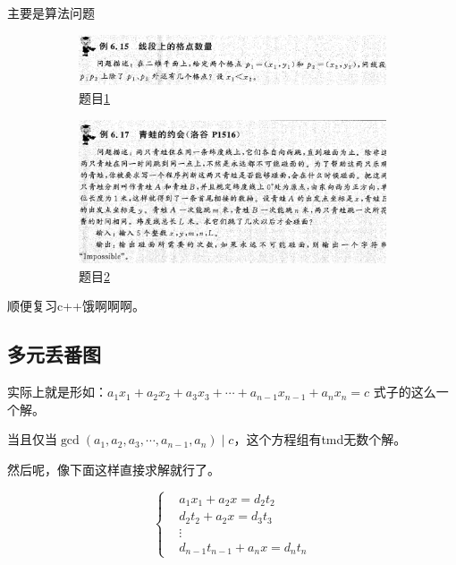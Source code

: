\documentclass[12pt]{article}
\begin{document}
主要是算法问题
\begin{figure}[htb!]
    \centering
    \begin{subfigure}{1\textwidth}
        \includegraphics[width=\textwidth]{./images/6.15}
        \caption{题目\ref{fig.exa_1}}
        \label{fig.exa_1}
    \end{subfigure}
    \begin{subfigure}{1\textwidth}
        \includegraphics[width=\textwidth]{./images/6.17}
        \caption{题目\ref{fig.exa_2}}
        \label{fig.exa_2}
    \end{subfigure}
    \caption{}
    \label{fig.exa}
\end{figure}

顺便复习c++饿啊啊啊。

\subsection{多元丢番图}

实际上就是形如：$a_{1}x_{1}+a_{2}x_{2}+a_{3}x_{3}+\cdots+a_{n-1}x_{n-1}+a_{n}x_{n}=c$ 式子的这么一个解。

当且仅当$\gcd(a_{1},a_{2},a_{3},\cdots,a_{n-1},a_{n}) \mid c$，这个方程组有tmd无数个解。

然后呢，像下面这样直接求解就行了。


\begin{displaymath}
    \left\{
        \begin{aligned}
            &a_{1}x_{1}+a_{2}x=d_2t_2\\
            &d_{2}t_{2}+a_{2}x=d_3t_3\\
            &\vdots\\
            &d_{n-1}t_{n-1}+a_{n}x=d_nt_n
        \end{aligned}
    \right.
\end{displaymath}
\end{document}
